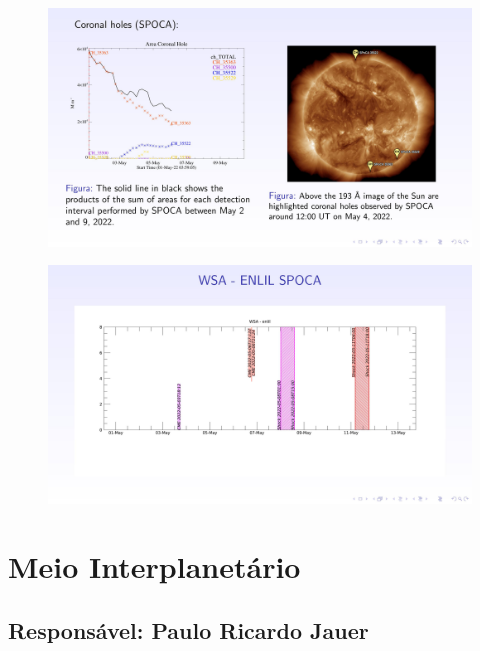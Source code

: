\documentclass[a4paper, 10pt]{article}
\begin{document}
    \begin{figure}[H]
        \centering
        \includegraphics[width=14cm]{./figures/pt_outfileSun_0.jpg}
    \end{figure} 
 

    
    \begin{figure}[H]
        \centering
        \includegraphics[width=14cm]{./figures/pt_outfileSun_1.jpg}
    \end{figure} 
 

    \section{Meio Interplanetário} 
 \subsection{Responsável: Paulo Ricardo Jauer} 
 
\end{document}
